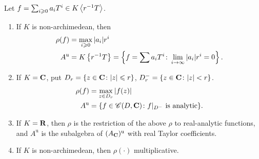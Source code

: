 \begin{theorem}\label{thm:tate-algebra}
Let $f=\sum_{i\geqslant 0} a_i T^i\in K\left\langle r^{-1} T \right\rangle$. 
\begin{enumerate}
\item
If $K$ is non-archimedean, then 
\begin{align*}
	\rho(f) &= \max_{i\geqslant 0} |a_i| r^i \\
	A^\mathrm{u} &= K\left\{ r^{-1} T \right\} = \left\{f=\sum a_i T^i\colon \lim_{i\to \infty} |a_i| r^i = 0\right\} .
\end{align*}

\item
If $K=\mathbf{C}$, put $D_r=\{z\in \mathbf{C}\colon |z|\leqslant r\}$, 
$D_r^-=\{z\in \mathbf{C}\colon |z|<r\}$. 
\begin{align*}
	\rho(f) &= \max_{z\in D_r} |f(z)| \\
	A^\mathrm{u} &= \{f\in \mathscr{C}(D,\mathbf{C})\colon f|_{D^-}\text{ is analytic}\} .
\end{align*}

\item
If $K=\mathbf{R}$, then $\rho$ is the restriction of the above $\rho$ to real-analytic 
functions, and $A^\mathrm{u}$ is the subalgebra of $(A_{\mathbf{C}})^\mathrm{u}$ with 
real Taylor coefficients. 

\item
If $K$ is non-archimedean, then $\rho(\cdot)$ multiplicative. 
\end{enumerate}
\end{theorem}
